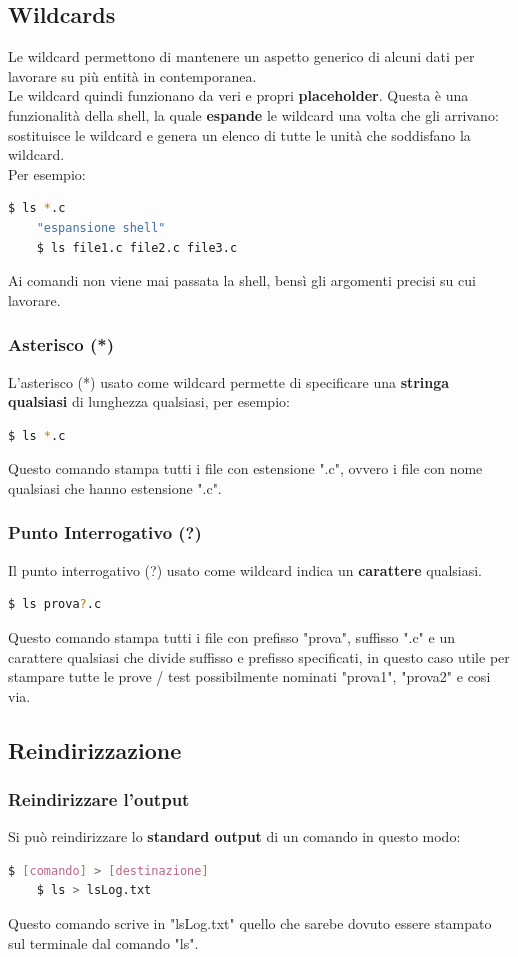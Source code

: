 \documentclass[12pt,a4paper]{article}
\begin{document}
\subsection{Wildcards}
Le wildcard permettono di mantenere un aspetto generico di alcuni dati per lavorare su più entità in contemporanea.\\
Le wildcard quindi funzionano da veri e propri \textbf{placeholder}.
Questa è una funzionalità della shell, la quale \textbf{espande} le wildcard una volta che gli arrivano: sostituisce le wildcard e genera un elenco di tutte le unità che soddisfano la wildcard.\\
Per esempio:
\begin{lstlisting}[language=bash]
    $ ls *.c
    "espansione shell"
    $ ls file1.c file2.c file3.c
\end{lstlisting}
Ai comandi non viene mai passata la shell, bensì gli argomenti precisi su cui lavorare.
\subsubsection{Asterisco (*)}
L'asterisco (*) usato come wildcard permette di specificare una \textbf{stringa} \textbf{qualsiasi} di lunghezza qualsiasi, per esempio:
\begin{lstlisting}[language=bash]
    $ ls *.c
\end{lstlisting}
Questo comando stampa tutti i file con estensione ".c", ovvero i file con nome qualsiasi che hanno estensione ".c".
\subsubsection{Punto Interrogativo (?)}
Il punto interrogativo (?) usato come wildcard indica un \textbf{carattere} qualsiasi.
\begin{lstlisting}[language=bash]
    $ ls prova?.c
\end{lstlisting}
Questo comando stampa tutti i file con prefisso "prova", suffisso ".c" e un carattere qualsiasi che divide suffisso e prefisso specificati, in questo caso utile per stampare tutte le prove / test possibilmente nominati "prova1", "prova2" e cosi via.
\subsection{Reindirizzazione}
\subsubsection{Reindirizzare l'output}
Si può reindirizzare lo \textbf{standard output} di un comando in questo modo:
\begin{lstlisting}[language=bash]
    $ [comando] > [destinazione]
    $ ls > lsLog.txt
\end{lstlisting}
Questo comando scrive in "lsLog.txt" quello che sarebe dovuto essere stampato sul terminale dal comando "ls".
\end{document}
